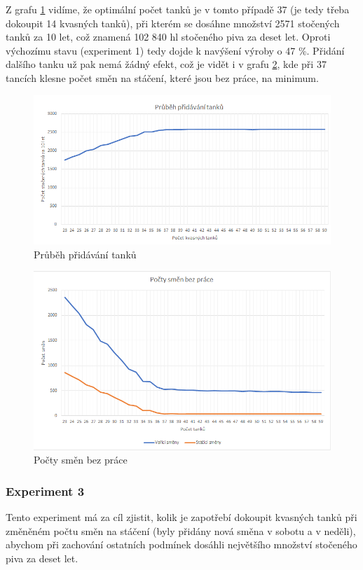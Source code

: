 \documentclass[11pt,a4paper]{article}
\begin{document}
Z grafu \ref{fig:exp2tanky} vidíme, že optimální počet tanků je v tomto případě 37 (je tedy třeba dokoupit 14 kvasných tanků), při kterém se dosáhne množství 2571 stočených tanků za 10 let, což znamená 102 840 hl stočeného piva za deset let. Oproti výchozímu stavu (experiment 1) tedy dojde k navýšení výroby o 47 \%. Přidání dalšího tanku už pak nemá žádný efekt, což je vidět i v grafu \ref{fig:exp2smeny}, kde při 37 tancích klesne počet směn na stáčení, které jsou bez práce, na minimum.
\begin{figure}[H]
  \centering
  \includegraphics[width=15cm]{exp2tanky.png}
  \caption{Průběh přidávání tanků}
  \label{fig:exp2tanky}
\end{figure}

\begin{figure}[H]
  \centering
  \includegraphics[width=15cm]{exp2smeny.png}
  \caption{Počty směn bez práce}
  \label{fig:exp2smeny}
\end{figure}


\subsubsection{Experiment 3}
Tento experiment má za cíl zjistit, kolik je zapotřebí dokoupit kvasných tanků při změněném počtu směn na stáčení (byly přidány nová směna v sobotu a v neděli), abychom při zachování ostatních podmínek dosáhli největšího množství stočeného piva za deset let.
\end{document}
